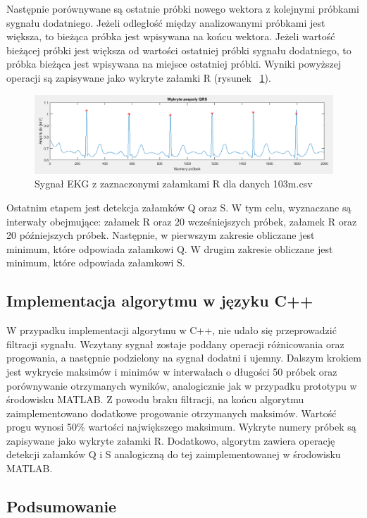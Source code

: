 \documentclass[10pt,a4paper]{article}
\begin{document}
Następnie porównywane są ostatnie próbki nowego wektora z kolejnymi próbkami sygnału dodatniego. Jeżeli odległość między analizowanymi próbkami jest większa, to bieżąca próbka jest wpisywana na końcu wektora. Jeżeli wartość bieżącej próbki jest większa od wartości ostatniej próbki sygnału dodatniego, to próbka bieżąca jest wpisywana na miejsce ostatniej próbki. Wyniki powyższej operacji są zapisywane jako wykryte załamki R (rysunek ~\ref{fig:dom18}).

\begin{figure}
  	\centering
    \includegraphics[width=1\textwidth]{dom18}
    \caption{Sygnał EKG z zaznaczonymi załamkami R dla danych 103m.csv}
  	\label{fig:dom18}
\end{figure}

Ostatnim etapem jest detekcja załamków Q oraz S. W tym celu, wyznaczane są interwały obejmujące: załamek R oraz 20 wcześniejszych próbek, załamek R oraz 20 późniejszych próbek. Następnie, w pierwszym zakresie obliczane jest minimum, które odpowiada załamkowi Q. W drugim zakresie obliczane jest minimum, które odpowiada załamkowi S.

\subsection{Implementacja algorytmu w języku C++}

W przypadku implementacji algorytmu w C++, nie udało się przeprowadzić filtracji sygnału. Wczytany sygnał zostaje poddany operacji różnicowania oraz progowania, a następnie podzielony na sygnał dodatni i ujemny. Dalszym krokiem jest wykrycie maksimów i minimów w interwałach o długości 50 próbek oraz porównywanie otrzymanych wyników, analogicznie jak w przypadku prototypu w środowisku MATLAB. Z powodu braku filtracji, na końcu algorytmu zaimplementowano dodatkowe progowanie otrzymanych maksimów. Wartość progu wynosi 50\% wartości największego maksimum. Wykryte numery próbek są zapisywane jako wykryte załamki R. Dodatkowo, algorytm zawiera operację detekcji załamków Q i S analogiczną do tej zaimplementowanej w środowisku MATLAB.

\subsection{Podsumowanie}
\end{document}
